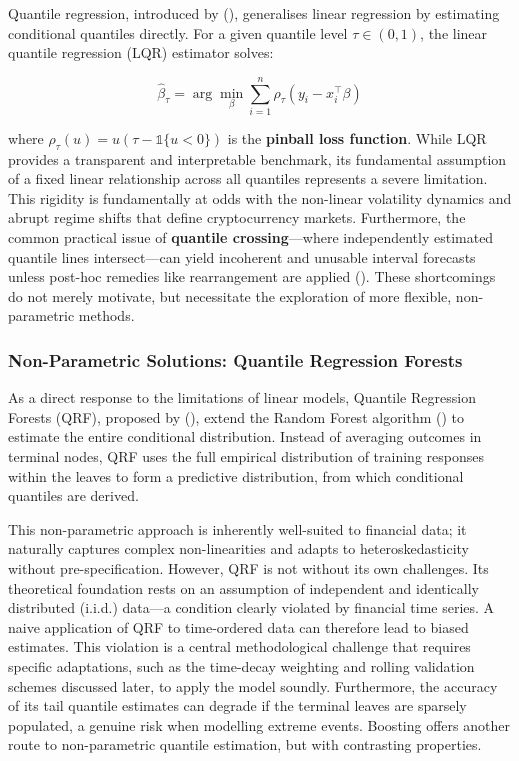 \documentclass[
  a4paper,
  DIV=11,
  numbers=noendperiod]{scrreprt}
\begin{document}
Quantile regression, introduced by (), generalises linear regression by estimating
conditional quantiles directly. For a given quantile level
\(\tau \in (0,1)\), the linear quantile regression (LQR) estimator
solves:

\[\hat{\beta}_\tau = \arg\min_{\beta} \sum_{i=1}^{n} \rho_\tau(y_i - x_i^\top\beta)\]

where \(\rho_\tau(u) = u(\tau - \mathbb{1}\{u<0\})\) is the
\textbf{pinball loss function}. While LQR provides a transparent and
interpretable benchmark, its fundamental assumption of a fixed linear
relationship across all quantiles represents a severe limitation. This
rigidity is fundamentally at odds with the non-linear volatility
dynamics and abrupt regime shifts that define cryptocurrency markets.
Furthermore, the common practical issue of \textbf{quantile
crossing}---where independently estimated quantile lines intersect---can
yield incoherent and unusable interval forecasts unless post-hoc
remedies like rearrangement are applied
(). These shortcomings do not merely motivate, but
necessitate the exploration of more flexible, non-parametric methods.

\subsubsection{Non-Parametric Solutions: Quantile Regression
Forests}\label{non-parametric-solutions-quantile-regression-forests}

As a direct response to the limitations of linear models, Quantile
Regression Forests (QRF), proposed by
(), extend the Random
Forest algorithm () to estimate
the entire conditional distribution. Instead of averaging outcomes in
terminal nodes, QRF uses the full empirical distribution of training
responses within the leaves to form a predictive distribution, from
which conditional quantiles are derived.

This non-parametric approach is inherently well-suited to financial
data; it naturally captures complex non-linearities and adapts to
heteroskedasticity without pre-specification. However, QRF is not
without its own challenges. Its theoretical foundation rests on an
assumption of independent and identically distributed (i.i.d.) data---a
condition clearly violated by financial time series. A naive application
of QRF to time-ordered data can therefore lead to biased estimates. This
violation is a central methodological challenge that requires specific
adaptations, such as the time-decay weighting and rolling validation
schemes discussed later, to apply the model soundly. Furthermore, the
accuracy of its tail quantile estimates can degrade if the terminal
leaves are sparsely populated, a genuine risk when modelling extreme
events. Boosting offers another route to non-parametric quantile
estimation, but with contrasting properties.
\end{document}
